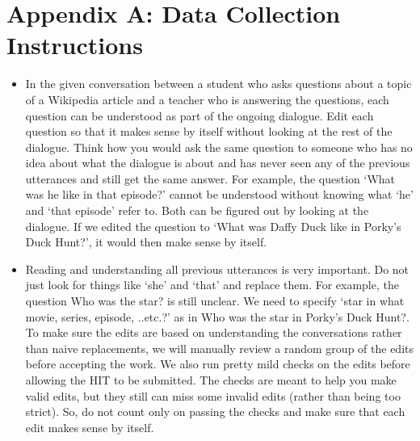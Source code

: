 \onecolumn
\section*{Appendix A: Data Collection Instructions}
\renewcommand\thefigure{\arabic{figure}}    
\setcounter{figure}{0}   

\begin{tcolorbox}[width=\textwidth,colback={white},title={Rewrite each question in a dialogue so it can be understood by itself without looking at the rest of the dialogue.},colbacktitle=white,coltitle=black]    

\begin{itemize}


\item In the given conversation between a student who asks questions about a topic of a Wikipedia
 article and a teacher who is answering the questions, each question can be understood as part of the
  ongoing dialogue. Edit each question so that it makes sense by itself without looking at the rest of 
   the  dialogue. Think how you would ask the same question to someone who has no idea about what
   the dialogue is about and has never seen any of the previous utterances and still get the same
    answer.
   For example, the question `What was he like in that episode?' cannot be understood without knowing
    what `he' and `that episode' refer to. Both can be figured out by looking at the dialogue. If we edited
    the question to `What was Daffy Duck like in Porky's Duck Hunt?', it would then make sense by
     itself.
     \item Reading and understanding all previous utterances is very important. Do not just look for things
 like `she' and `that' and replace them. For example, the question Who was the star? is still unclear. We
  need to specify `star in what movie, series, episode, ..etc.?' as in Who was the star in Porky's Duck
   Hunt?. To make sure the edits are based on understanding the conversations rather than naive
    replacements, we will manually review a random group of the edits before accepting the work. We
     also run pretty mild checks on the edits before allowing the HIT to be submitted. The checks are
      meant to help you make valid edits, but they still can miss some invalid edits (rather than being too
       strict). So, do not count only on passing the checks and make sure that each edit makes sense by
        itself.


\end{itemize}
\end{tcolorbox}
